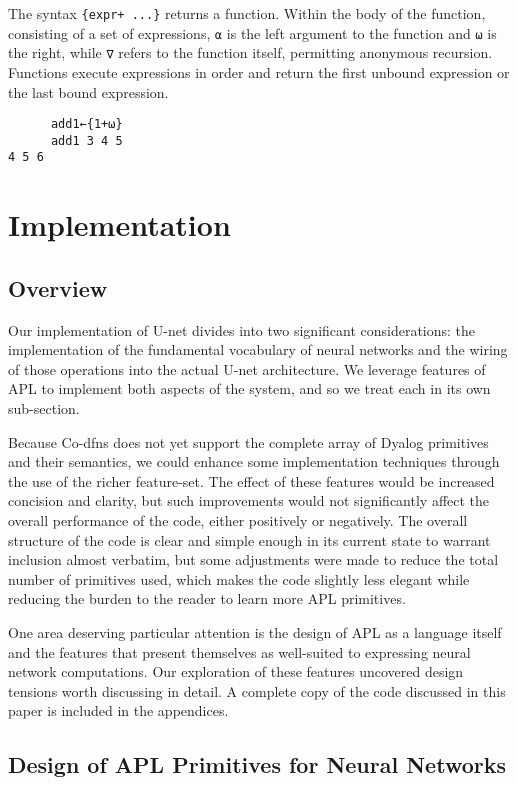 \documentclass[10pt,twocolumn,english,format=sigplan,screen,balance]{acmart}
\begin{document}
The syntax \texttt{\{expr+ ...\}} returns a function. Within the body
of the function, consisting of a set of expressions, \texttt{⍺} is
the left argument to the function and \texttt{⍵} is the right, while
\texttt{∇} refers to the function itself, permitting anonymous recursion.
Functions execute expressions in order and return the first unbound
expression or the last bound expression.
\begin{verbatim}
      add1←{1+⍵}
      add1 3 4 5
4 5 6
\end{verbatim}

\section{Implementation}

\subsection{Overview}

Our implementation of U-net divides into two significant considerations:
the implementation of the fundamental vocabulary of neural networks
and the wiring of those operations into the actual U-net architecture.
We leverage features of APL to implement both aspects of the system,
and so we treat each in its own sub-section. 

Because Co-dfns does not yet support the complete array of Dyalog
primitives and their semantics, we could enhance some implementation
techniques through the use of the richer feature-set. The effect of
these features would be increased concision and clarity, but such
improvements would not significantly affect the overall performance
of the code, either positively or negatively. The overall structure
of the code is clear and simple enough in its current state to warrant
inclusion almost verbatim, but some adjustments were made to reduce
the total number of primitives used, which makes the code slightly
less elegant while reducing the burden to the reader to learn more
APL primitives.

One area deserving particular attention is the design of APL as a
language itself and the features that present themselves as well-suited
to expressing neural network computations. Our exploration of these
features uncovered design tensions worth discussing in detail. A complete
copy of the code discussed in this paper is included in the appendices.

\subsection{Design of APL Primitives for Neural Networks}
\end{document}
